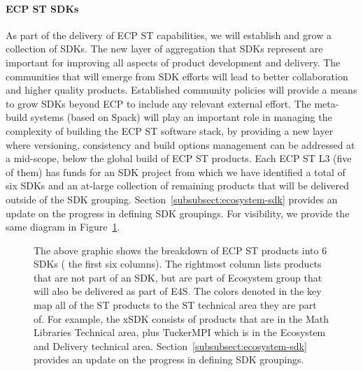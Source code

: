 \paragraph{ECP ST SDKs}
As part of the delivery of ECP ST capabilities, we will establish and grow a collection of SDKs. The new layer of aggregation that SDKs represent are important for improving all aspects of product development and delivery. The communities that will emerge from SDK efforts will lead to better collaboration and higher quality products. Established community policies will provide a means to grow SDKs beyond ECP to include any relevant external effort. The meta-build systems (based on Spack) will play an important role in managing the complexity of building the ECP ST software stack, by providing a new layer where versioning, consistency and build options management can be addressed at a mid-scope, below the global build of ECP ST products.
Each ECP ST L3 (five of them) has funds for an SDK project from which we have identified a total of six SDKs and an at-large collection of remaining products that will be delivered outside of the SDK grouping.  Section~\ref{subsubsect:ecosystem-sdk} provides an update on the progress in defining SDK groupings. For visibility, we provide the same diagram in Figure~\ref{fig:sdk-definition1-0}.

\begin{figure}[htb]
	\centering
	\caption{\label{fig:sdk-definition1-0}The above graphic shows the breakdown of ECP ST products into 6 SDKs ( the first six columns).  The rightmost column lists products that are not part of an SDK, but are part of Ecosystem group that will also be delivered as part of E4S. The colors denoted in the key map all of the ST products to the ST technical area they are part of.  For example, the xSDK consists of products that are in the Math Libraries Technical area, plus TuckerMPI which is in the Ecosystem and Delivery technical area.  Section~\ref{subsubsect:ecosystem-sdk} provides an update on the progress in defining SDK groupings.}
\end{figure}


